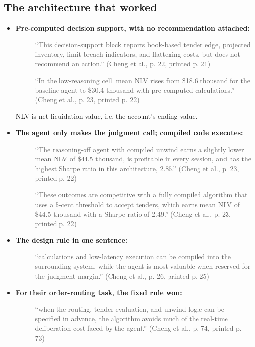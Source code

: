 \documentclass{article}
\begin{document}
\subsection{The architecture that worked}

\begin{itemize}

\item \textbf{Pre-computed decision support, with no recommendation attached:}

\begin{quote}``This decision-support block reports book-based tender edge, projected inventory, limit-breach indicators, and flattening costs, but does not recommend an action.'' (Cheng et al., p. 22, printed p. 21)\end{quote}

\begin{quote}``In the low-reasoning cell, mean NLV rises from \$18.6 thousand for the baseline agent to \$30.4 thousand with pre-computed calculations.'' (Cheng et al., p. 23, printed p. 22)\end{quote}

NLV is net liquidation value, i.e. the account's ending value.

\item \textbf{The agent only makes the judgment call; compiled code executes:}

\begin{quote}``The reasoning-off agent with compiled unwind earns a slightly lower mean NLV of \$44.5 thousand, is profitable in every session, and has the highest Sharpe ratio in this architecture, 2.85.'' (Cheng et al., p. 23, printed p. 22)\end{quote}

\begin{quote}``These outcomes are competitive with a fully compiled algorithm that uses a 5-cent threshold to accept tenders, which earns mean NLV of \$44.5 thousand with a Sharpe ratio of 2.49.'' (Cheng et al., p. 23, printed p. 22)\end{quote}

\item \textbf{The design rule in one sentence:}

\begin{quote}``calculations and low-latency execution can be compiled into the surrounding system, while the agent is most valuable when reserved for the judgment margin.'' (Cheng et al., p. 26, printed p. 25)\end{quote}

\item \textbf{For their order-routing task, the fixed rule won:}

\begin{quote}``when the routing, tender-evaluation, and unwind logic can be specified in advance, the algorithm avoids much of the real-time deliberation cost faced by the agent.'' (Cheng et al., p. 74, printed p. 73)\end{quote}

\end{itemize}
\end{document}

